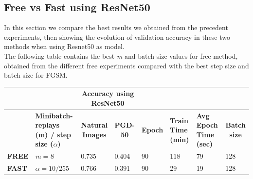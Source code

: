 \documentclass{article}
\begin{document}
\subsection{Free vs Fast using ResNet50}
In this section we compare the best results we obtained from the precedent
experiments, then showing the evolution of validation accuracy in these two
methods when using Resnet50 as model. \\
The following table contains the best \textit{m} and batch size values for free method,
obtained from the different free experiments compared with the best step size
and batch size for FGSM. 

\begin{table}[hbt!]
\begin{tabular}{|l|p{2.1cm}|c|l|l|l|l|l|}
\hline
              & \multicolumn{1}{l|}{}         &
              \multicolumn{2}{c|}{\textbf{Accuracy using ResNet50}}
              & \multicolumn{3}{l|}{\textbf{}}
              & \textbf{}                                \\ \hline
 & \textbf{Minibatch-replays (m) / step size ($\alpha$)} & \textbf{Natural
 Images}                      & \multicolumn{1}{c|}{\textbf{PGD-50}} &
 \multicolumn{1}{c|}{\textbf{Epoch}} & \multicolumn{1}{p{1cm}|}{\textbf{Train
 Time (min)}} & \multicolumn{1}{p{1cm}|}{\textbf{Avg Epoch Time (sec)}} &
 \multicolumn{1}{c|}{\textbf{Batch size}} \\ \hline
\textbf{FREE} & \textit{m} = 8 & \multicolumn{1}{l|}{0.735} & { 0.404}         & { 90}
& { 118}                     & { 79}                         & { 128}
\\ \hline
\textbf{FAST} & $\alpha = 10/255$       & \multicolumn{1}{l|}{0.766} & { 0.391}
& { 90}           & { 29}                     & { 19}                         &
{ 128}               \\ \hline
\end{tabular}
\end{table}

\newpage
\end{document}
